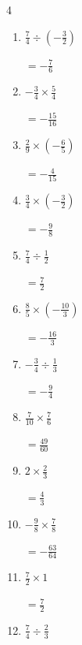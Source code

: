 \begin{multicols}{4}
\begin{enumerate}
        $\displaystyle =-2$

  \item $\displaystyle \frac{7}{4}\div{}\left(-\frac{3}{2}\right)$

        $\displaystyle =-\frac{7}{6}$

  \item $\displaystyle -\frac{3}{4}\times{}\frac{5}{4}$

        $\displaystyle =-\frac{15}{16}$

  \item $\displaystyle \frac{2}{9}\times{}\left(-\frac{6}{5}\right)$

        $\displaystyle =-\frac{4}{15}$

  \item $\displaystyle \frac{3}{4}\times{}\left(-\frac{3}{2}\right)$

        $\displaystyle =-\frac{9}{8}$

\columnbreak %

  \item $\displaystyle \frac{7}{4}\div{}\frac{1}{2}$

        $\displaystyle =\frac{7}{2}$

  \item $\displaystyle \frac{8}{5}\times{}\left(-\frac{10}{3}\right)$

        $\displaystyle =-\frac{16}{3}$

  \item $\displaystyle -\frac{3}{4}\div{}\frac{1}{3}$

        $\displaystyle =-\frac{9}{4}$

  \item $\displaystyle \frac{7}{10}\times{}\frac{7}{6}$

        $\displaystyle =\frac{49}{60}$

  \item $\displaystyle 2\times{}\frac{2}{3}$

        $\displaystyle =\frac{4}{3}$

  \item $\displaystyle -\frac{9}{8}\times{}\frac{7}{8}$

        $\displaystyle =-\frac{63}{64}$

  \item $\displaystyle \frac{7}{2}\times{}1$

        $\displaystyle =\frac{7}{2}$

  \item $\displaystyle \frac{7}{4}\div{}\frac{2}{3}$


\end{enumerate}
\end{multicols}
